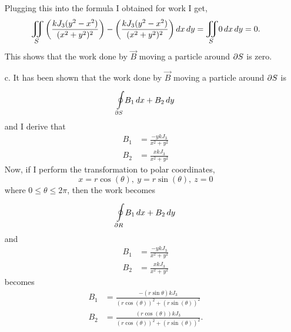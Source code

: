 \documentclass[titlepage]{article}
\begin{document}
\begin{solution}
\begin{itemize}
\begin{align*}
\end{align*}
Plugging this into the formula I obtained for work I get,
$$\bigiint{S}{} \left(\frac{kJ_3(y^2 - x^2)}{(x^2 + y^2)^2}\right) - \left(\frac{kJ_3(y^2 - x^2)}{(x^2 + y^2)^2}\right)dx\,dy = \bigiint{S}{} 0 \,dx\,dy = 0.$$
This shows that the work done by $\vec{B}$ moving a particle around $\partial S$ is zero.
\item[c.] It has been shown that the work done by $\vec{B}$ moving a particle around $\partial S$ is
$$\boint{\p S}{} B_1\,dx + B_2\,dy$$
and I derive that
\begin{align*}
B_1 &= \frac{-ykJ_3}{x^2 + y^2} \\ 
B_2 &= \frac{xkJ_3}{x^2 + y^2}
\end{align*}
Now, if I perform the transformation to polar coordinates,
$$x = r\cos(\theta), \ y = r\sin(\theta), \ z = 0 $$
where $0\leq \theta\leq 2\pi$, then the work becomes
$$\boint{\p R}{} B_1\,dx + B_2\,dy $$
and 
\begin{align*}
    B_1 &= \frac{-ykJ_3}{x^2 + y^2} \\ 
    B_2 &= \frac{xkJ_3}{x^2 + y^2}
\end{align*}
becomes
\begin{align*}
    B_1 &= \frac{-(r\sin{\theta})kJ_3}{(r\cos(\theta))^2 + (r\sin(\theta))^2} \\ 
    B_2 &= \frac{(r\cos(\theta))kJ_3}{(r\cos(\theta))^2 + (r\sin(\theta))^2}.
\end{align*}


\end{itemize}
\end{solution}
\end{document}
